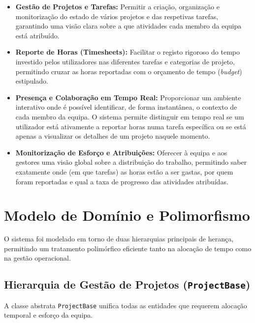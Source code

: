\documentclass{llncs}
\begin{document}
\begin{itemize}
    \item \textbf{Gestão de Projetos e Tarefas:} Permitir a criação, organização e monitorização do estado de vários projetos e das respetivas tarefas, garantindo uma visão clara sobre a que atividades cada membro da equipa está atribuído.
    
    \item \textbf{Reporte de Horas (Timesheets):} Facilitar o registo rigoroso do tempo investido pelos utilizadores nas diferentes tarefas e categorias de projeto, permitindo cruzar as horas reportadas com o orçamento de tempo (\textit{budget}) estipulado.
    
    \item \textbf{Presença e Colaboração em Tempo Real:} Proporcionar um ambiente interativo onde é possível identificar, de forma instantânea, o contexto de cada membro da equipa. O sistema permite distinguir em tempo real se um utilizador está ativamente a reportar horas numa tarefa específica ou se está apenas a visualizar os detalhes de um projeto naquele momento.
    
    \item \textbf{Monitorização de Esforço e Atribuições:} Oferecer à equipa e aos gestores uma visão global sobre a distribuição do trabalho, permitindo saber exatamente onde (em que tarefas) as horas estão a ser gastas, por quem foram reportadas e qual a taxa de progresso das atividades atribuídas.
\end{itemize}

\newpage

\section{Modelo de Domínio e Polimorfismo}
O sistema foi modelado em torno de duas hierarquias principais de herança, permitindo um tratamento polimórfico eficiente tanto na alocação de tempo como na gestão operacional.

\subsection{Hierarquia de Gestão de Projetos (\texttt{ProjectBase})}
A classe abstrata \texttt{ProjectBase} unifica todas as entidades que requerem alocação temporal e esforço da equipa.
\end{document}
